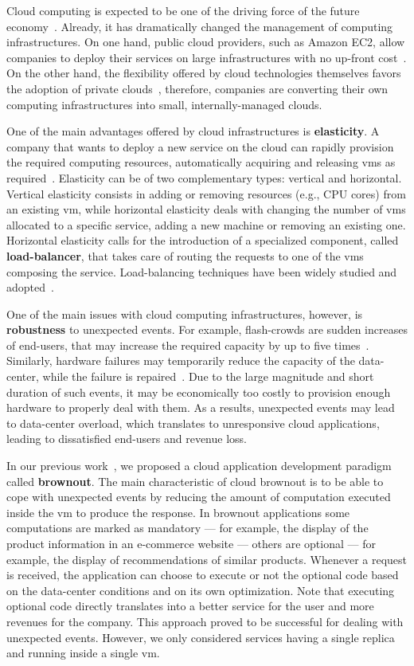 Cloud computing is expected to be one of the driving force of the
future economy~\citep{WPonMckinsey13}. Already, it has dramatically
changed the management of computing infrastructures. On one hand,
public cloud providers, such as Amazon EC2, allow companies to deploy
their services on large infrastructures with no up-front
cost~\citep{Buyya09:FGCS}. On the other hand, the flexibility offered
by cloud technologies themselves favors the adoption of private
clouds~\citep{Gulati11:HotCloud}, therefore, companies are converting
their own computing infrastructures into small, internally-managed
clouds.

One of the main advantages offered by cloud infrastructures is {\bf
  elasticity}. A company that wants to deploy a new service on the
cloud can rapidly provision the required computing resources,
automatically acquiring and releasing \acp{vm} as
required~\citep{Herbst13:ICAC}.  Elasticity can be of two
complementary types: vertical and horizontal. Vertical elasticity
consists in adding or removing resources (e.g., CPU cores) from an
existing \ac{vm}, while horizontal elasticity deals with changing the
number of \acp{vm} allocated to a specific service, adding a new
machine or removing an existing one.
%
Horizontal elasticity calls for the introduction of a specialized
component, called {\bf load-balancer}, that takes care of routing the
requests to one of the \acp{vm} composing the service. Load-balancing
techniques have been widely studied and
adopted~\citep{Barroso09,Lu11:PerfEval,Lin12:IGCC}.

One of the main issues with cloud computing infrastructures, however,
is {\bf robustness} to unexpected events. For example, flash-crowds
are sudden increases of end-users, that may increase the required
capacity by up to five times~\citep{Bodik10:SoCC}. Similarly, hardware
failures may temporarily reduce the capacity of the data-center, while
the failure is repaired~\citep{Barroso09}. Due to the large magnitude
and short duration of such events, it may be economically too costly
to provision enough hardware to properly deal with them. As a results,
unexpected events may lead to data-center overload, which translates
to unresponsive cloud applications, leading to dissatisfied end-users
and revenue loss.

In our previous work~\citep{cloudish-tr}, we proposed a cloud
application development paradigm called {\bf brownout}. The main
characteristic of cloud brownout is to be able to cope with unexpected
events by reducing the amount of computation executed inside the
\ac{vm} to produce the response. In brownout applications some
computations are marked as mandatory --- for example, the display of the
product information in an e-commerce website --- others are optional ---
for example, the display of recommendations of similar products.
Whenever a request is
received, the application can choose to execute or not the optional
code based on the data-center conditions and on its own
optimization. Note that executing optional code directly translates
into a better service for the user and more revenues for the company. This approach
proved to be successful for dealing with unexpected events. However,
we only considered services having a single replica and running inside
a single \ac{vm}.

